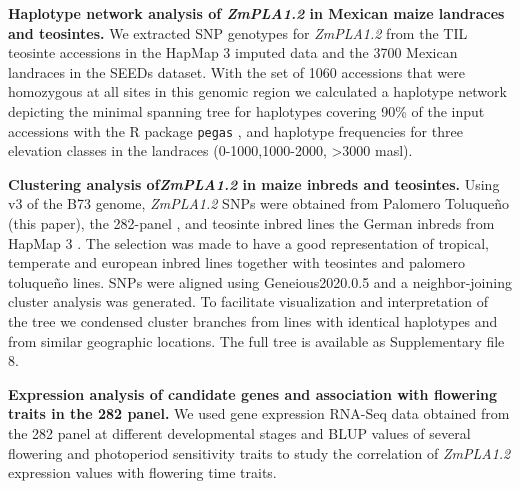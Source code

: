 \documentclass[9pt,twocolumn,twoside,lineno]{BioRxiv}
\def\code#1{\texttt{#1}}
\begin{document}
\textbf{Haplotype network analysis of \textit{ZmPLA1.2} in Mexican maize landraces and teosintes.}
We extracted SNP genotypes for \textit{ZmPLA1.2} from the TIL teosinte accessions in the HapMap 3 imputed data \cite{Bukowski2017-ng} and the 3700 Mexican landraces in the SEEDs dataset. 
With the set of 1060 accessions that were homozygous at all sites in this genomic region we calculated a haplotype network depicting the minimal spanning tree for haplotypes covering 90\% of the input accessions with the R package \code{pegas} \cite{paradis2010}, and haplotype frequencies for three elevation classes in the landraces (0-1000,1000-2000, >3000 masl).

\textbf{Clustering analysis of\textit{ZmPLA1.2} in maize inbreds and teosintes.}
Using v3 of the B73 genome, \textit{ZmPLA1.2} SNPs were obtained from Palomero Toluqueño (this paper), the 282-panel \cite{Flint-Garcia2005-hb},  and teosinte inbred lines the German inbreds from HapMap 3 \cite{Bukowski2017-ng}. 
The selection was made to have a good representation of tropical, temperate and european inbred lines together with teosintes and palomero toluqueño lines.
SNPs were aligned using Geneious2020.0.5 and a neighbor-joining cluster analysis was generated. 
To facilitate visualization and interpretation of the tree we condensed cluster branches from lines with identical haplotypes and from similar geographic locations. 
The full tree is available as Supplementary file 8. 

\textbf{Expression analysis of candidate genes and association with flowering traits in the 282 panel.}
We used gene expression RNA-Seq data obtained from the 282 panel at different developmental stages \cite{Kremling2018-gn} and BLUP values of several flowering and photoperiod sensitivity traits \cite{Hung2012-ms} to study the correlation of \textit{ZmPLA1.2} expression values with flowering time traits.  
\end{document}
